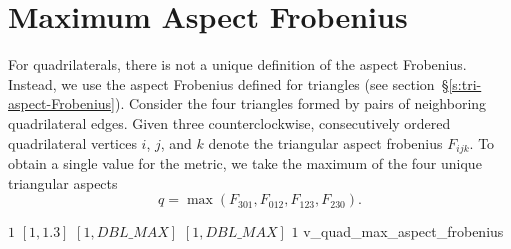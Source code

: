 \section{Maximum Aspect Frobenius}

For quadrilaterals, there is not a unique definition of the aspect Frobenius.
Instead, we use the aspect Frobenius
defined for triangles (see section~\S\ref{s:tri-aspect-Frobenius}).
Consider the four triangles formed by pairs of neighboring quadrilateral edges.
Given three counterclockwise, consecutively ordered quadrilateral vertices $i$, $j$, and $k$
denote the triangular aspect frobenius $F_{ijk}$.
To obtain a single value for the metric, we take the maximum of the four unique triangular aspects
\[
  q = \max\left(F_{301}, F_{012}, F_{123}, F_{230}\right).
\]

%
{$1$}%
{$[1,1.3]$}%
{$[1,DBL\_MAX]$}%
{$[1,DBL\_MAX]$}%
{$1$}%
{\cite{pebay:04}}%
{v\_quad\_max\_aspect\_frobenius}%

